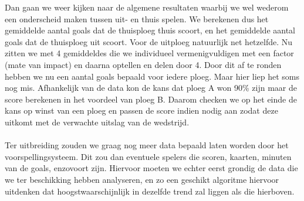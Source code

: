 \documentclass[11pt, a4paper]{article}
\begin{document}
Dan gaan we weer kijken naar de algemene resultaten waarbij we wel wederom een onderscheid maken tussen uit- en thuis spelen. We berekenen dus het gemiddelde aantal goals dat de thuisploeg thuis scoort, en het gemiddelde aantal goals dat de thuisploeg uit scoort. Voor de uitploeg natuurlijk net hetzelfde. Nu zitten we met 4 gemiddeldes die we individueel vermenigvuldigen met een factor (mate van impact) en daarna optellen en delen door 4. Door dit af te ronden hebben we nu een aantal goals bepaald voor iedere ploeg. Maar hier liep het soms nog mis. Afhankelijk van de data kon de kans dat ploeg A won 90\% zijn maar de score berekenen in het voordeel van ploeg B.
Daarom checken we op het einde de kans op winst van een ploeg en passen de score indien nodig aan zodat deze uitkomt met de verwachte uitslag van de wedstrijd.
\\
\\
Ter uitbreiding zouden we graag nog meer data bepaald laten worden door het voorspellingsysteem. Dit zou dan eventuele spelers die scoren, kaarten, minuten van de goals, enzovoort zijn. Hiervoor moeten we echter eerst grondig de data die we ter beschikking hebben analyseren, en zo een geschikt algoritme hiervoor uitdenken dat hoogstwaarschijnlijk in dezelfde trend zal liggen als die hierboven.
\end{document}
